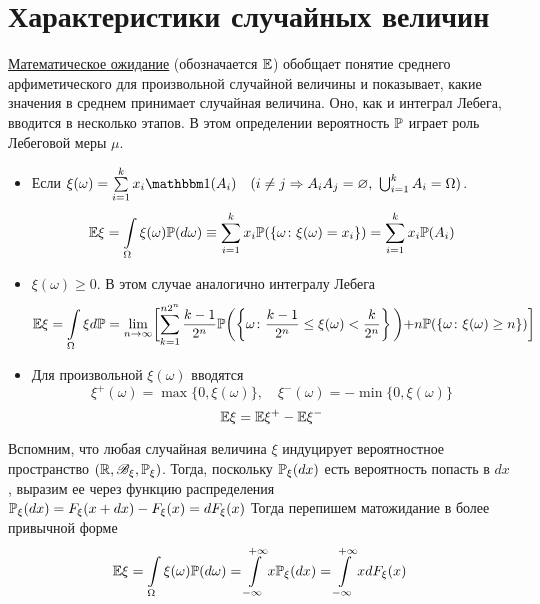 \documentclass[../TV&MS.tex]{subfiles}
\begin{document}
    
\section{Характеристики случайных величин}

\underline{Математическое ожидание} (обозначается $\mathbb{E}$) обобщает понятие среднего арфиметического для произвольной случайной величины и показывает, какие значения в среднем принимает случайная величина. Оно, как и интеграл Лебега, вводится в несколько этапов. В этом определении вероятность $\mathbb{P}$ играет роль
Лебеговой меры $\mu$.

\begin{itemize}
 	\item Если $\xi(\omega) = \sum\limits_{i=1}^kx_i \Ind(A_i) \quad (i \not= j \Rightarrow A_iA_j = \varnothing, \ \bigcup_{i=1}^k A_i = \Omega)$. 
 	$$\mathbb{E} \xi = \int\limits_{\Omega} \xi(\omega) \mathbb{P}(d\omega) \equiv \sum\limits_{i=1}^k x_i \mathbb{P}(\left\{ \omega \colon \xi(\omega)=x_i \right\}) =  \sum\limits_{i=1}^k x_i \mathbb{P}(A_i)$$
	\item $\xi(\omega) \ge 0$. В этом случае аналогично интегралу Лебега
	$$ \mathbb{E} \xi = \int\limits_{\Omega} \xi d\mathbb{P} = \lim_{n \to \infty}  \biggl[  \sum\limits_{k=1}^{n2^n} \frac{k-1}{2^n} \mathbb{P}\biggl(\left\{ \omega \colon \frac{k-1}{2^n} \le \xi(\omega) < \frac{k}{2^n} \right\}\biggl) 
	+ n \mathbb{P}(\left\{ \omega \colon \xi(\omega) \ge n \right\})\biggl]$$
	\item Для произвольной $\xi(\omega)$ вводятся
	$$ \xi^+(\omega) = \max\{0, \xi(\omega)\},\quad \xi^-(\omega) = -\min\{0, \xi(\omega)\}$$
	$$ \mathbb{E} \xi = \mathbb{E} \xi^+ - \mathbb{E} \xi^-$$
\end{itemize}

Вспомним, что любая случайная величина $\xi$ индуцирует вероятностное пространство $(\mathbb{R}, \mathscr{B}_\xi, \mathbb{P}_\xi)$. Тогда, поскольку $\mathbb{P}_\xi(dx)$ есть вероятность попасть
в $dx$, выразим ее через функцию распределения $\mathbb{P}_\xi(dx) = F_\xi(x + dx) - F_\xi(x) = dF_\xi(x)$ Тогда перепишем матожидание в более привычной форме
$$\mathbb{E}\xi = \int\limits_{\Omega} \xi(\omega) \mathbb{P}(d\omega) = \int\limits_{-\infty}^{+\infty} x \mathbb{P}_\xi(dx) = \int\limits_{-\infty}^{+\infty} x dF_\xi(x)$$
\end{document}
